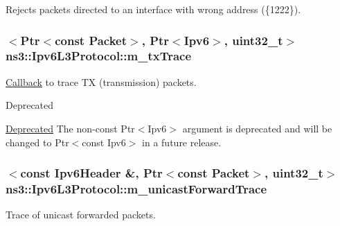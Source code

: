 Rejects packets directed to an interface with wrong address (\{1222\}). 

\subsubsection[{\texorpdfstring{m\+\_\+tx\+Trace}{m_txTrace}}]{$<${\bf Ptr}$<$const {\bf Packet}$>$, {\bf Ptr}$<${\bf Ipv6}$>$, uint32\+\_\+t$>$ ns3\+::\+Ipv6\+L3\+Protocol\+::m\+\_\+tx\+Trace\hspace{0.3cm}{\ttfamily [private]}}\hypertarget{classns3_1_1Ipv6L3Protocol_a2037be8528273f3495216a09384e38e7}{}\label{classns3_1_1Ipv6L3Protocol_a2037be8528273f3495216a09384e38e7}


\hyperlink{classns3_1_1Callback}{Callback} to trace TX (transmission) packets. 

\begin{DoxyRefDesc}{Deprecated}
\item[\hyperlink{deprecated__deprecated000013}{Deprecated}]The non-\/const {\ttfamily Ptr$<$\+Ipv6$>$} argument is deprecated and will be changed to {\ttfamily Ptr$<$const Ipv6$>$} in a future release. \end{DoxyRefDesc}
\subsubsection[{\texorpdfstring{m\+\_\+unicast\+Forward\+Trace}{m_unicastForwardTrace}}]{$<$const {\bf Ipv6\+Header} \&, {\bf Ptr}$<$const {\bf Packet}$>$, uint32\+\_\+t$>$ ns3\+::\+Ipv6\+L3\+Protocol\+::m\+\_\+unicast\+Forward\+Trace\hspace{0.3cm}{\ttfamily [private]}}\hypertarget{classns3_1_1Ipv6L3Protocol_a76b5cbe054e52a240d3e1a3ea0f891fd}{}\label{classns3_1_1Ipv6L3Protocol_a76b5cbe054e52a240d3e1a3ea0f891fd}


Trace of unicast forwarded packets. 

